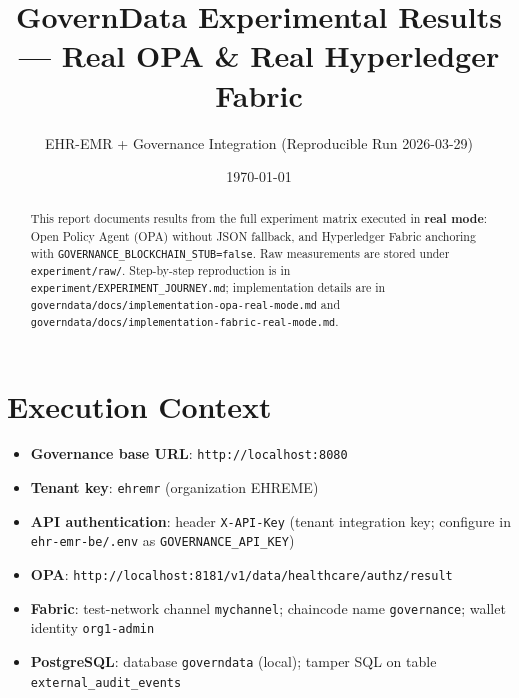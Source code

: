 \documentclass[11pt]{article}
\title{GovernData Experimental Results --- Real OPA \& Real Hyperledger Fabric}
\author{EHR-EMR + Governance Integration (Reproducible Run 2026-03-29)}
\date{\today}
\begin{document}
\maketitle

\begin{abstract}
This report documents results from the full experiment matrix executed in \textbf{real mode}: Open Policy Agent (OPA) without JSON fallback, and Hyperledger Fabric anchoring with \texttt{GOVERNANCE\_BLOCKCHAIN\_STUB=false}. Raw measurements are stored under \texttt{experiment/raw/}. Step-by-step reproduction is in \texttt{experiment/EXPERIMENT\_JOURNEY.md}; implementation details are in \texttt{governdata/docs/implementation-opa-real-mode.md} and \texttt{governdata/docs/implementation-fabric-real-mode.md}.
\end{abstract}

\section{Execution Context}
\begin{itemize}
  \item \textbf{Governance base URL}: \texttt{http://localhost:8080}
  \item \textbf{Tenant key}: \texttt{ehremr} (organization EHREME)
  \item \textbf{API authentication}: header \texttt{X-API-Key} (tenant integration key; configure in \texttt{ehr-emr-be/.env} as \texttt{GOVERNANCE\_API\_KEY})
  \item \textbf{OPA}: \texttt{http://localhost:8181/v1/data/healthcare/authz/result}
  \item \textbf{Fabric}: test-network channel \texttt{mychannel}; chaincode name \texttt{governance}; wallet identity \texttt{org1-admin}
  \item \textbf{PostgreSQL}: database \texttt{governdata} (local); tamper SQL on table \texttt{external\_audit\_events}
\end{itemize}
\end{document}
